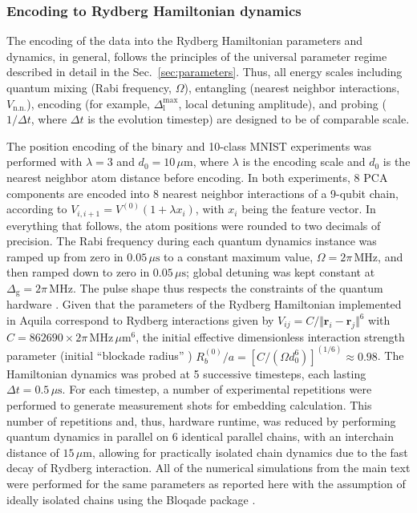 \documentclass[english,floatfix,twocolumn,showpacs, aps, prx, reprint, superscriptaddress, longbibliography]{revtex4-2}
\begin{document}
\subsubsection{Encoding to Rydberg Hamiltonian dynamics}

The encoding of the data into the Rydberg Hamiltonian parameters and dynamics, in general, follows the principles of the universal parameter regime described in detail in the Sec.~\ref{sec:parameters}. Thus, all energy scales including quantum mixing (Rabi frequency, $\Omega$), entangling (nearest neighbor interactions, $V_{\mathrm{n. n.}}$), encoding (for example, $\Delta_{\mathrm{l}}^{\mathrm{max}}$, local detuning amplitude), and probing ($1/\Delta t$, where $\Delta t$ is the evolution timestep) are designed to be of comparable scale.

The position encoding of the binary and 10-class MNIST experiments was performed with $\lambda = 3$ and $d_0=10 \, \mu \mathrm{m}$, where $\lambda$ is the encoding scale and $d_0$ is the nearest neighbor atom distance before encoding. In both experiments, 8 PCA components are encoded into 8 nearest neighbor interactions of a 9-qubit chain, according to $V_{i,i+1}=V^{(0)}(1+\lambda x_i)$, with $x_i$ being the feature vector. 
In everything that follows, the atom positions were rounded to two decimals of precision. The Rabi frequency during each quantum dynamics instance was ramped up from zero in $0.05 \, \mu \mathrm{s}$ to a constant maximum value, $\Omega= 2\pi \, \mathrm{MHz}$, and then ramped down to zero in $0.05 \, \mu \mathrm{s}$; global detuning was kept constant at $\Delta_{\mathrm{g}} = 2\pi \, \mathrm{MHz}$. The pulse shape thus respects the constraints of the quantum hardware \cite{Wurtz2023}.  Given that the parameters of the Rydberg Hamiltonian implemented in Aquila \cite{Wurtz2023} correspond to Rydberg interactions given by $V_{ij}=C/\Vert \mathbf{r}_i - \mathbf{r}_j\Vert^6$ with $C=862690 \times 2\pi \, \mathrm{MHz} \, \mu \mathrm{m}^6$, the initial effective dimensionless interaction strength parameter (initial ``blockade radius'' \cite{Bernien2017}) $R_{b}^{(0)}/a=[C/(\Omega d_0^6)]^{(1/6)} \approx 0.98$. The Hamiltonian dynamics was probed at 5 successive timesteps, each lasting $\Delta t= 0.5 \, \mu \mathrm{s}$. For each timestep, a number of experimental repetitions were performed to generate measurement shots for embedding calculation. This number of repetitions and, thus, hardware runtime, was reduced by performing quantum dynamics in parallel on 6 identical parallel chains, with an interchain distance of $15 \, \mu \mathrm{m}$, allowing for practically isolated chain dynamics due to the fast decay of Rydberg interaction. All of the numerical simulations from the main text were performed for the same parameters as reported here with the assumption of ideally isolated chains using the Bloqade package \cite{bloqade2023quera}.
\end{document}
